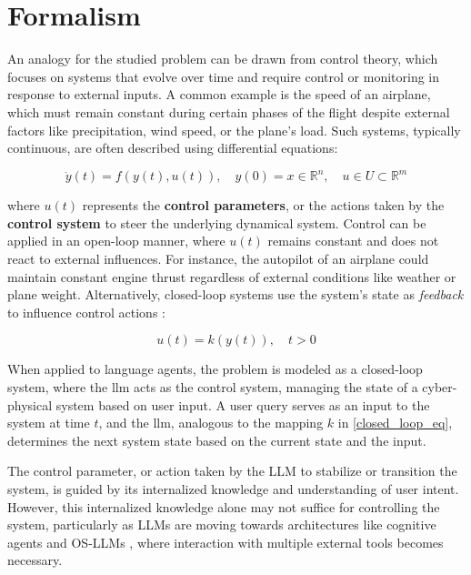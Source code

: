 \section{Formalism}

An analogy for the studied problem can be drawn from control theory, which focuses on systems that evolve over time and require control or monitoring in response to external inputs. A common example is the speed of an airplane, which must remain constant during certain phases of the flight despite external factors like precipitation, wind speed, or the plane's load. Such systems, typically continuous, are often described using differential equations:

\begin{equation}
    \dot{y}(t) = f(y(t), u(t)), \quad y(0) = x \in \mathbb{R}^n, \quad u \in U \subset \mathbb{R}^m
\end{equation}

where $u(t)$ represents the \textbf{control parameters}, or the actions taken by the \textbf{control system} to steer the underlying dynamical system. Control can be applied in an open-loop manner, where $u(t)$ remains constant and does not react to external influences. For instance, the autopilot of an airplane could maintain constant engine thrust regardless of external conditions like weather or plane weight. Alternatively, closed-loop systems use the system’s state as \textit{feedback} to influence control actions \cite{zabczyk2020mathematical}:

\begin{equation}\label{closed_loop_eq}
    u(t) = k(y(t)), \quad t > 0
\end{equation}

When applied to language agents, the problem is modeled as a closed-loop system, where the \gls{llm} acts as the control system, managing the state of a cyber-physical system based on user input. A user query serves as an input to the system at time $t$, and the \gls{llm}, analogous to the mapping $k$ in \autoref{closed_loop_eq}, determines the next system state based on the current state and the input.

\pskip

The control parameter, or action taken by the LLM to stabilize or transition the system, is guided by its internalized knowledge and understanding of user intent. However, this internalized knowledge alone may not suffice for controlling the system, particularly as LLMs are moving towards architectures like cognitive agents \cite{sumers2024cognitivearchitectureslanguageagents} and OS-LLMs \cite{aiasos}, where interaction with multiple external tools becomes necessary.

